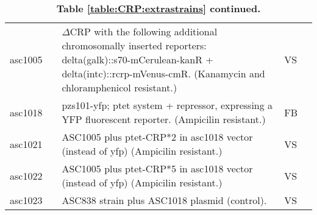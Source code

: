 \begin{table}[h]
\begin{tabularx}{\textwidth}{llXll}
%
asc1005	& &	$\Delta$CRP with the following additional chromosomally inserted reporters: delta(galk)::s70-mCerulean-kanR + delta(intc)::rcrp-mVenus-cmR. (Kanamycin and chloramphenicol resistant.) & VS \\
asc1018	& &	pzs101-yfp; ptet system + repressor, expressing a YFP fluorescent reporter. (Ampicilin resistant.) & FB \\
asc1021	& &	ASC1005 plus ptet-CRP*2 in asc1018 vector (instead of yfp) (Ampicilin resistant.) & VS \\
asc1022	& &	ASC1005 plus ptet-CRP*5 in asc1018 vector (instead of yfp) (Ampicilin resistant.) & VS \\
asc1023	& & ASC838 strain plus ASC1018 plasmid (control). & VS \\
		\hline
	\end{tabularx}
	\caption{\textbf{Table \ref{table:CRP:extrastrains} continued.}}
\end{table}